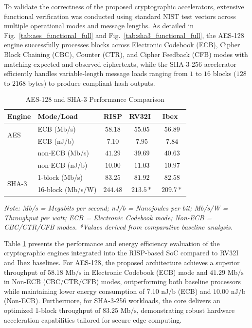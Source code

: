 To validate the correctness of the proposed cryptographic accelerators, extensive functional verification was conducted using standard NIST test vectors across multiple operational modes and message lengths. As detailed in Fig.~\ref{tab:aes_functional_full} and Fig.~\ref{tab:sha3_functional_full}, the AES-128 engine successfully processes blocks across Electronic Codebook (ECB), Cipher Block Chaining (CBC), Counter (CTR), and Cipher Feedback (CFB) modes with matching expected and observed ciphertexts, while the SHA-3-256 accelerator efficiently handles variable-length message loads ranging from $1$ to $16$ blocks ($128$ to $2168$ bytes) to produce compliant hash outputs.

\begin{table}[!t]
\centering
\caption{AES-128 and SHA-3 Performance Comparison}
\label{tab:crypto_perf}
\small
\begin{tabular}{l l c c c}
\toprule
\textbf{Engine} & \textbf{Mode/Load} & \textbf{RISP} & \textbf{RV32I~\cite{harris2021digital}} & \textbf{Ibex~\cite{gallmann2021swift}} \\
\midrule
\multirow{2}{*}{AES} & ECB (Mb/s) & $58.18$ & $55.05$ & $56.89$ \\
                     & ECB (nJ/b) & $7.10$ & $7.95$ & $7.84$ \\
                     & non-ECB (Mb/s) & $41.29$ & $39.69$ & $40.63$ \\
                     & non-ECB (nJ/b) & $10.00$ & $11.03$ & $10.97$ \\
\midrule
\multirow{2}{*}{SHA-3} & 1-block (Mb/s) & $83.25$ & $81.92$ & $82.58$ \\
                       & 16-block (Mb/s/W) & $244.48$ & $213.5*$ & $209.7*$ \\
\bottomrule
\end{tabular}
\vspace{1pt}
\raggedright
\footnotesize\textit{Note: Mb/s = Megabits per second; nJ/b = Nanojoules per bit; Mb/s/W = Throughput per watt; ECB = Electronic Codebook mode; Non-ECB = CBC/CTR/CFB modes. *Values derived from comparative baseline analysis.}
\end{table}

Table \ref{tab:crypto_perf} presents the performance and energy efficiency evaluation of the cryptographic engines integrated into the RISP-based SoC compared to RV32I and Ibex baselines. For AES-128, the proposed architecture achieves a superior throughput of $58.18\text{ Mb/s}$ in Electronic Codebook (ECB) mode and $41.29\text{ Mb/s}$ in Non-ECB (CBC/CTR/CFB) modes, outperforming both baseline processors while maintaining lower energy consumption of $7.10\text{ nJ/b}$ (ECB) and $10.00\text{ nJ/b}$ (Non-ECB). Furthermore, for SHA-3-256 workloads, the core delivers an optimized 1-block throughput of $83.25\text{ Mb/s}$, demonstrating robust hardware acceleration capabilities tailored for secure edge computing.

